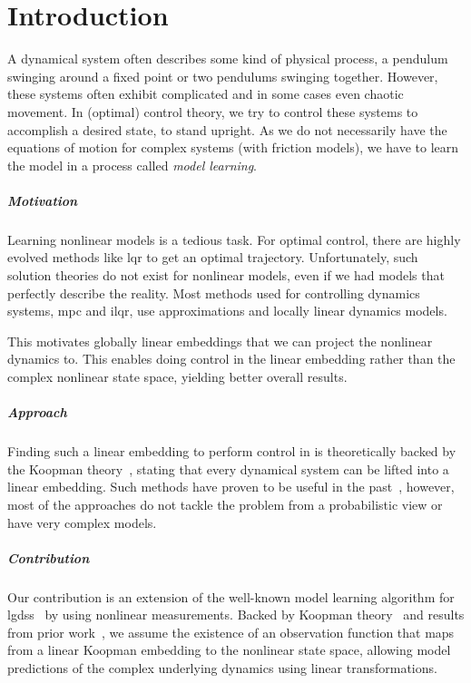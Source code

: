 \chapter{Introduction}
\label{c:introduction}



A dynamical system often describes some kind of physical process, \eg a pendulum swinging around a fixed point or two pendulums swinging together. However, these systems often exhibit complicated and in some cases even chaotic movement. In (optimal) control theory, we try to control these systems to accomplish a desired state, \eg to stand upright. As we do not necessarily have the equations of motion for complex systems (\eg with friction models), we have to learn the model in a process called \emph{model learning}.

\paragraph{Motivation}
	Learning nonlinear models is a tedious task. For optimal control, there are highly evolved methods like \ac{lqr} to get an optimal trajectory. Unfortunately, such solution theories do not exist for nonlinear models, even if we had models that perfectly describe the reality. Most methods used for controlling dynamics systems, \eg \ac{mpc} and \ac{ilqr}, use approximations and locally linear dynamics models.

	This motivates globally linear embeddings that we can project the nonlinear dynamics to. This enables doing control in the linear embedding rather than the complex nonlinear state space, yielding better overall results.

\paragraph{Approach}
	Finding such a linear embedding to perform control in is theoretically backed by the Koopman theory~\cite{koopmanHamiltonianSystemsTransformation1931}, stating that every dynamical system can be lifted into a linear embedding. Such methods have proven to be useful in the past~\cite{kaiserDatadrivenDiscoveryKoopman2020,hanDeepLearningKoopman2020,mortonDeepVariationalKoopman2019a}, however, most of the approaches do not tackle the problem from a probabilistic view or have very complex models.

\paragraph{Contribution}
	Our contribution is an extension of the well-known model learning algorithm for \acp{lgds}~\cite{ghahramaniParameterEstimationLinear1996,minkaHiddenMarkovModels1999} by using nonlinear measurements. Backed by Koopman theory~\cite{koopmanHamiltonianSystemsTransformation1931} and results from prior work~\cite{luschDeepLearningUniversal2018}, we assume the existence of an observation function that maps from a linear Koopman embedding to the nonlinear state space, allowing model predictions of the complex underlying dynamics using linear transformations.

